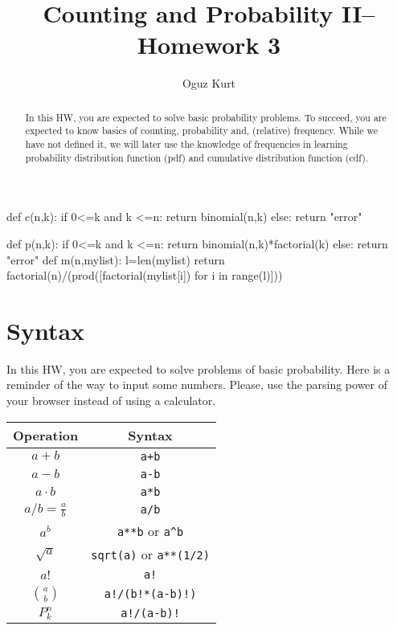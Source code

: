 \documentclass{ximera}
\title{Counting and Probability II-- Homework 3}
\author{Oguz Kurt}
\begin{document}
\begin{abstract}
In this HW, you are expected to solve basic probability problems. To succeed, you are expected to know basics of counting, probability and, (relative) frequency. While we have not defined it, we will later use the knowledge of frequencies in learning probability distribution function (pdf) and cumulative distribution function (cdf).
\end{abstract}
\maketitle

\begin{sagesilent}
def c(n,k):
    if 0<=k and k <=n:
        return binomial(n,k)
    else:
        return "error"

def p(n,k):
    if 0<=k and k <=n:
        return binomial(n,k)*factorial(k)
    else:
        return "error"
def m(n,mylist):
    l=len(mylist)
    return factorial(n)/(prod([factorial(mylist[i]) for i in range(l)]))
\end{sagesilent}

\section*{Syntax}
In this HW, you are expected to solve problems of basic probability. Here is a reminder of the way to input some numbers. Please, use the parsing power of your browser instead of using a calculator.

\hspace{0.5cm}


\begin{tabular}{c|c}
Operation & Syntax  
\\
\hline
$a+b$ & {\color{red} \verb!a+b!} 
\\
\hline
$a- b$ & {\color{red} \verb!a-b!} 
\\
\hline
$a\cdot b$ & {\color{red} \verb!a*b! } 
\\
\hline
$a/b=\frac{a}{b}$ & {\color{red} \verb!a/b!}
\\
\hline
$a^b$ & {\color{red} \verb|a**b| or \verb|a^b|} 
\\
\hline
$\sqrt{a}$ & {\color{red} \verb|sqrt(a)| or \verb|a**(1/2)|} 
\\
\hline
$a!$ & {\color{red} \verb|a!|} 
\\
\hline
$\binom{a}{b}$ & {\color{red} \verb|a!/(b!*(a-b)!)|}
\\
\hline
$P_k^n$ & {\color{red} \verb|a!/(a-b)!|}
\\
\end{tabular}
\end{document}
